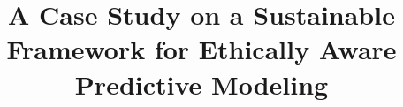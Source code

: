 \documentclass[conference]{IEEEtran}
\begin{document}
\title{A Case Study on a Sustainable Framework for Ethically Aware Predictive Modeling}

\author{}




\maketitle

\end{document}
